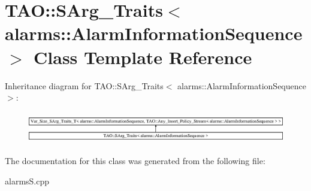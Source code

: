 \section{T\+AO\+:\+:S\+Arg\+\_\+\+Traits$<$ alarms\+:\+:Alarm\+Information\+Sequence $>$ Class Template Reference}
\label{classTAO_1_1SArg__Traits_3_01alarms_1_1AlarmInformationSequence_01_4}
Inheritance diagram for T\+AO\+:\+:S\+Arg\+\_\+\+Traits$<$ alarms\+:\+:Alarm\+Information\+Sequence $>$\+:\begin{figure}[H]
\begin{center}
\leavevmode
\includegraphics[height=1.424936cm]{classTAO_1_1SArg__Traits_3_01alarms_1_1AlarmInformationSequence_01_4}
\end{center}
\end{figure}


The documentation for this class was generated from the following file\+:\begin{DoxyCompactItemize}
\item 
alarms\+S.\+cpp\end{DoxyCompactItemize}
